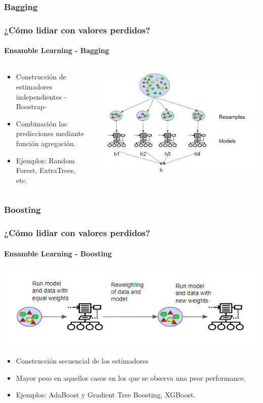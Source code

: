 \documentclass{beamer}
\begin{document}
\subsubsection{Bagging}
\begin{frame}
	\frametitle{¿Cómo lidiar con valores perdidos?}
	\framesubtitle{Ensamble Learning - Bagging}
	\begin{columns}
		\begin{column}{0.48\textwidth}
	\begin{itemize}		
		\item Construcción de estimadores independientes -Boostrap-
		\item  Combinación las predicciones mediante función agregación. 
		\item Ejemplos: Random Forest, ExtraTrees, etc.
	\end{itemize}
		\end{column}
		\begin{column}{0.85\textwidth}
			\includegraphics[width=0.7\linewidth, height=0.7\textheight]{img/bagging}
		\end{column}
	\end{columns}
\end{frame}

\subsubsection{Boosting}
\begin{frame}
	\frametitle{¿Cómo lidiar con valores perdidos?}
	\framesubtitle{Ensamble Learning - Boosting}
	\includegraphics[width=1\linewidth, height=0.5\textheight]{img/boosting}
	\begin{itemize}		
		\item Construcción secuencial de los estimadores 
		\item Mayor peso en aquellos casos en los que se observa una peor performance. 
		\item Ejemplos: AdaBoost y Gradient Tree Boosting, XGBoost.
	\end{itemize}
\end{frame}
\end{document}
